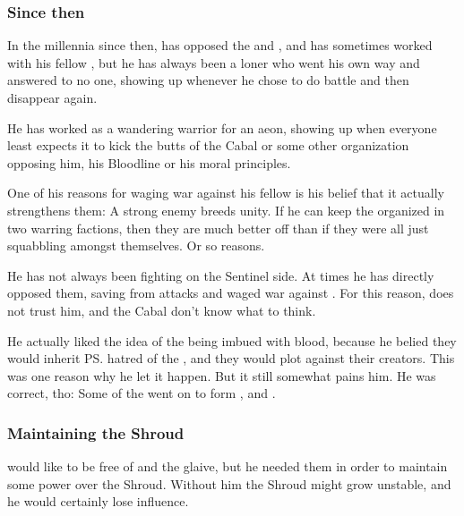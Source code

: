 \subsubsection{Since then}
In the millennia since then, \Ishnaruchaefir{} has opposed the \banes{} and \resphain{}, and has sometimes worked with his fellow \dragons, but he has always been a loner who went his own way and answered to no one, showing up whenever he chose to do battle and then disappear again. 

He has worked as a wandering warrior for an aeon, showing up when everyone least expects it to kick the butts of the Cabal or some other organization opposing him, his Bloodline or his moral principles. 

One of his reasons for waging war against his fellow \dragons{} is his belief that it actually strengthens them: A strong enemy breeds unity. If he can keep the \dragons{} organized in two warring factions, then they are much better off than if they were all just squabbling amongst themselves. Or so \Ishna{} reasons.

He has not always been fighting on the Sentinel side. At times he has directly opposed them, saving \resphain{} from \draconic{} attacks and waged war against \dragons. For this reason, \HriistD{} does not trust him, and the Cabal don't know what to think. 

He actually liked the idea of the \resphain{} being imbued with \draconic{} blood, because he belied they would inherit \ps{\Nexagglachel}{} hatred of the \banes{}, and they would plot against their creators. This was one reason why he let it happen. But it still somewhat pains him. He was correct, tho: Some of the \satharioth{} went on to form \Kezerad, \Mystraacht{} and \Baelzerach. 






\subsubsection{Maintaining the Shroud}
\Ishnaruchaefir would like to be free of \Rystessakhin and the glaive, but he needed them in order to maintain some power over the Shroud.
Without him the Shroud might grow unstable, and he would certainly lose influence.

